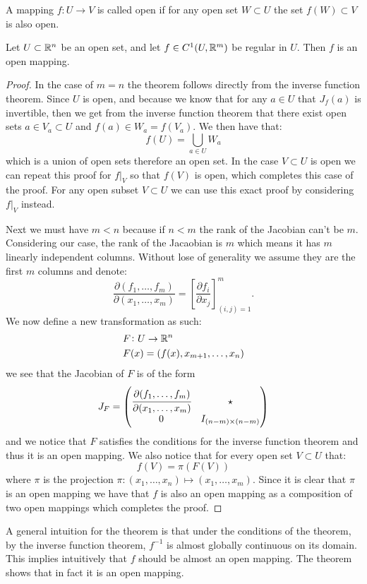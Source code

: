\documentclass[11pt,a4paper]{article}
\begin{document}
\begin{definition}
  A mapping $f \colon U \to V$ is called open if for any open set 
  $W \subset U$ the set $f(W) \subset V$ is also open.
\end{definition}
\begin{theorem}
  \label{thm:open-mapping}
  Let $U \subset \mathbb{R}^n$ be an open set, and let $f \in C^1(U,\mathbb{R}^m)$ be 
  regular in $U$. Then $f$ is an open mapping.
\end{theorem}
\begin{proof}
  In the case of $m = n$ the theorem follows directly from the inverse
  function theorem. Since $U$ is open, and because we know that
  for any $a \in U$ that $J_f(a)$ is invertible, then we get from the
  inverse function theorem that there exist open sets $a \in V_a \subset U$ 
  and $f(a) \in W_a = f(V_a)$.
  We then have that:
  \[
    f(U) = \bigcup_{a \in U} W_a
  \]
  which is a union of open sets therefore an open set.
  In the case $V \subset U$ is open we can repeat this proof
  for $f\vert_V$ so that $f(V)$ is open,
  which completes this case of the proof.
  For any open subset $V \subset U$ we can
  use this exact proof by considering $f\vert_V$ instead.

  Next we must have $m < n$ because if $n < m$ the rank of the
  Jacobian can't be $m$. Considering our case, the rank of the Jacaobian
  is $m$ which means it has $m$ linearly independent columns. Without
  lose of generality we assume they are the first $m$ columns and 
  denote:
  \[
    \frac{\partial(f_1,\dots,f_m)}{\partial(x_1,\dots,x_m)} = 
    \left[\frac{\partial f_i}{\partial x_j}\right]_{(i,j)=1}^{m}.
  \]
  We now define a new transformation as such:
  \begin{align*}
    &F \colon U \to \mathbb{R}^n \\
    &F(x) = (f(x),x_{m+1},\dots,x_{n})
  \end{align*}
  we see that the Jacobian of $F$ is of the form
  \[
    J_F = \begin{pmatrix}
\cfrac{\partial(f_1,\dots,f_m)}{\partial(x_1,\dots,x_m)} & \star \\
0 & I_{(n-m) \times (n-m)}\\
      \end{pmatrix}
  \]
  and we notice that $F$ satisfies the conditions for the inverse function
  theorem and thus it is an open mapping. We also notice that for
  every open set $V \subset U$ that:
  \[
    f(V) = \pi(F(V))
  \]
  where $\pi$ is the projection 
  $\pi \colon (x_1,\dots,x_n) \mapsto (x_1,\dots,x_m)$. Since
  it is clear that $\pi$ is an open mapping we have that $f$
  is also an open mapping as a composition of two open mappings
  which completes the proof.
\end{proof}
\begin{remark}
  A general intuition for the theorem is that under the conditions
  of the theorem, by the inverse function theorem, $f^{-1}$
  is almost globally continuous on its domain.
  This implies intuitively that $f$ should be almost an open mapping.
  The theorem shows that in fact it is an open mapping.
\end{remark}
\end{document}
